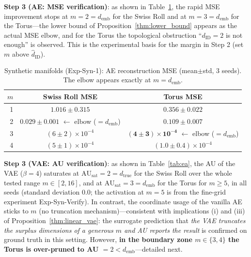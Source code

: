 \documentclass[make,article,submit,pdftex,moreauthors]{Definitions/mdpi}
\newcommand{\dID}{d_{\mathrm{ID}}}
\newcommand{\hatdID}{\hat{d}_{\mathrm{ID}}}
\newcommand{\dtrue}{d_{\mathrm{true}}}
\newcommand{\AUsat}{\mathrm{AU}_{\mathrm{sat}}}
\newcommand{\demb}{d_{\mathrm{emb}}}
\begin{document}
\textbf{Step 3 (AE: MSE verification)}: as shown in Table~\ref{tab:e1}, the
rapid MSE improvement stops at $m = 2 = \demb$ for the Swiss Roll and at
$m = 3 = \demb$ for the Torus---the lower bound of
Proposition~\ref{thm:lower_bound} appears as the actual MSE elbow, and for
the Torus the topological obstruction ``$\dID = 2$ is not enough'' is
observed.
This is the experimental basis for the margin in Step 2 (set $m$ above
$\hatdID$).

\begin{table}[H]
\caption{Synthetic manifolds (Exp-Syn-1): AE reconstruction MSE
(mean$\pm$std, 3 seeds). The elbow appears exactly at $m = \demb$.}
\label{tab:e1}
\small
\begin{tabular}{rcc}
\toprule
$m$ & \textbf{Swiss Roll MSE} & \textbf{Torus MSE} \\
\midrule
1 & $1.016 \pm 0.315$ & $0.356 \pm 0.022$ \\
2 & $\boldsymbol{0.029 \pm 0.001}$ $\leftarrow$ elbow ($= \demb$) & $0.109 \pm 0.007$ \\
3 & $(6 \pm 2) \times 10^{-4}$ & $\boldsymbol{(4 \pm 3) \times 10^{-4}}$ $\leftarrow$ elbow ($= \demb$) \\
4 & $(5 \pm 1) \times 10^{-4}$ & $(1.0 \pm 0.4) \times 10^{-4}$ \\
\bottomrule
\end{tabular}
\end{table}

\textbf{Step 3 (VAE: AU verification)}: as shown in Table~\ref{tab:ea},
the AU of the VAE ($\beta = 4$) saturates at $\AUsat = 2 = \dtrue$ for the
Swiss Roll over the whole tested range $m \in [2, 16]$, and at
$\AUsat = 3 = \demb$ for the Torus for $m \geq 5$, in all seeds (standard
deviation 0.0; the activation at $m = 5$ is from the fine-grid experiment
Exp-Syn-Verify).
In contrast, the coordinate usage of the vanilla AE sticks to $m$ (no
truncation mechanism)---consistent with implications (i) and (iii) of
Proposition~\ref{thm:linear_vae}: the surrogate prediction that \textit{the
VAE truncates the surplus dimensions of a generous $m$ and AU reports the
result} is confirmed on ground truth in this setting.
However, \textbf{in the boundary zone $m \in \{3, 4\}$ the Torus is
over-pruned to AU $= 2 < \demb$}---detailed next.
\end{document}
